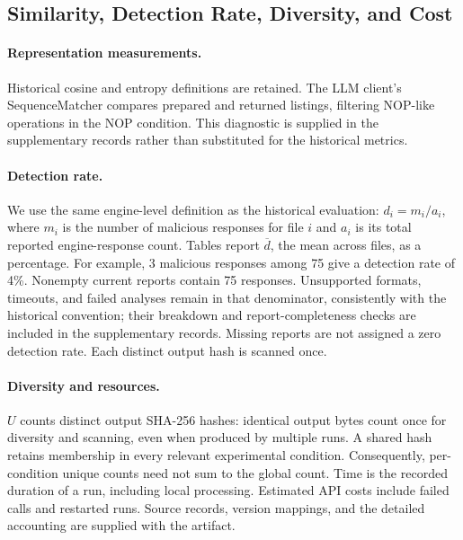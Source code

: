 \subsection{Similarity, Detection Rate, Diversity, and Cost}
\paragraph{Representation measurements.}
Historical cosine and entropy definitions are retained. The LLM client's
SequenceMatcher compares prepared and returned listings, filtering
NOP-like operations in the NOP condition. This diagnostic is supplied in
the supplementary records rather than substituted for the historical metrics.

\paragraph{Detection rate.}
We use the same engine-level definition as the historical evaluation:
$d_i=m_i/a_i$, where $m_i$ is the number of malicious responses for file
$i$ and $a_i$ is its total reported engine-response count. Tables report
$\overline d$, the mean across files, as a percentage. For example,
3 malicious responses among 75 give a detection rate of 4\%.
Nonempty current reports contain 75 responses. Unsupported formats,
timeouts, and failed analyses remain in that denominator, consistently
with the historical convention; their breakdown and report-completeness
checks are included in the supplementary records. Missing reports are not
assigned a zero detection rate. Each distinct output hash is scanned once.

\paragraph{Diversity and resources.}
$U$ counts distinct output SHA-256 hashes: identical output bytes count
once for diversity and scanning, even when produced by multiple runs.
A shared hash retains membership in every relevant experimental condition.
Consequently, per-condition unique counts need not sum to the global count.
Time is the recorded duration of a run, including local processing.
Estimated API costs include failed calls and restarted runs. Source records,
version mappings, and the detailed accounting are supplied with the artifact.
